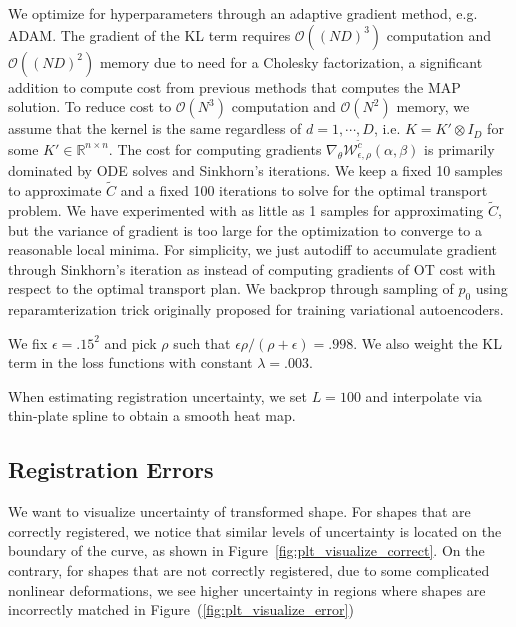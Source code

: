 \documentclass{6838publ}
\newcommand\sO{\ensuremath{\mathcal{O}}}
\newcommand\sW{\ensuremath{\mathcal{W}}}
\newcommand\R{\ensuremath{\mathbb{R}}} %
\begin{document}
We optimize for hyperparameters through an adaptive gradient method, e.g. ADAM. The gradient of the KL term requires $\sO((ND)^3)$ computation and $\sO((ND)^2)$ memory due to need for a Cholesky factorization, a significant addition to compute cost from previous methods that computes the MAP solution. To reduce cost to $\sO(N^3)$ computation and $\sO(N^2)$ memory, we assume that the kernel is the same regardless of $d=1,\cdots,D$, i.e. $K=K'\otimes I_D$ for some $K'\in\R^{n\times n}$. The cost for computing gradients $\nabla_{\theta} \sW_{\epsilon,\rho}^{\widetilde{c}}(\alpha,\beta)$ is primarily dominated by ODE solves and Sinkhorn's iterations. We keep a fixed 10 samples to approximate $\widetilde{C}$ and a fixed 100 iterations to solve for the optimal transport problem. We have experimented with as little as 1 samples for approximating $\widetilde{C}$, but the variance of gradient is too large for the optimization to converge to a reasonable local minima. For simplicity, we just autodiff to accumulate gradient through Sinkhorn's iteration as \cite{genevayLearningGenerativeModels2018} instead of computing gradients of OT cost with respect to the optimal transport plan. We backprop through sampling of $p_0$ using reparamterization trick originally proposed for training variational autoencoders.

We fix $\epsilon=.15^2$ and pick $\rho$ such that $\epsilon\rho/(\rho+\epsilon) = .998$. We also weight the KL term in the loss functions with constant $\lambda = .003$.

When estimating registration uncertainty, we set $L=100$ and interpolate via thin-plate spline to obtain a smooth heat map.


\subsection{Registration Errors}

We want to visualize uncertainty of transformed shape. For shapes that are correctly registered, we notice that similar levels of uncertainty is located on the boundary of the curve, as shown in Figure~\ref{fig:plt_visualize_correct}. On the contrary, for shapes that are not correctly registered, due to some complicated nonlinear deformations, we see higher uncertainty in regions where shapes are incorrectly matched in Figure~(\ref{fig:plt_visualize_error})


\newpage
\newpage



\end{document}
